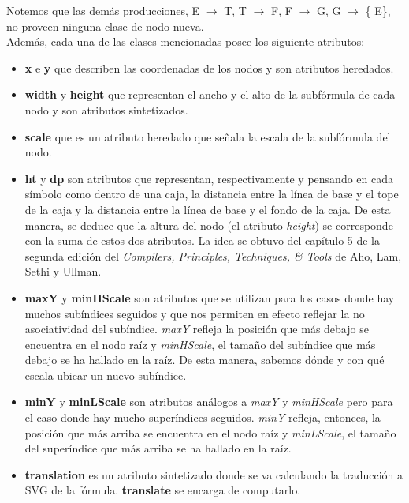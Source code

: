 \indent \indent Notemos que las demás producciones, E $\rightarrow$ T, T $\rightarrow$ F, F $\rightarrow$ G, G $\rightarrow$ \{ E\}, no proveen ninguna clase de nodo nueva.\\


\indent Además, cada una de las clases mencionadas posee los siguiente atributos:

\begin{itemize}
\item  \textbf{x} e \textbf{y} que describen las coordenadas de los nodos y son atributos heredados.
\item \textbf{width} y \textbf{height} que representan el ancho y el alto de la subfórmula de cada nodo y son atributos sintetizados.
\item \textbf{scale} que es un atributo heredado que señala la escala de la subfórmula del nodo.
\item \textbf{ht} y \textbf{dp} son atributos que representan, respectivamente y pensando en cada símbolo como dentro de una caja, la distancia entre la línea de base y el tope de la caja y la distancia entre la línea de base y el fondo de la caja. De esta manera, se deduce que la altura del nodo (el atributo \textit{height}) se corresponde con la suma de estos dos atributos. La idea se obtuvo del capítulo 5 de la segunda edición del \textit{Compilers, Principles, Techniques, \& Tools} de Aho, Lam, Sethi y Ullman.
\item \textbf{maxY} y \textbf{minHScale} son atributos que se utilizan para los casos donde hay muchos subíndices seguidos y que nos permiten en efecto reflejar la no asociatividad del subíndice. \textit{maxY} refleja la posición que más debajo se encuentra en el nodo raíz y \textit{minHScale}, el tamaño del subíndice que más debajo se ha hallado en la raíz. De esta manera, sabemos dónde y con qué escala ubicar un nuevo subíndice.
\item \textbf{minY} y \textbf{minLScale} son atributos análogos a \textit{maxY} y \textit{minHScale} pero para el caso donde hay mucho superíndices seguidos. \textit{minY} refleja, entonces, la posición que más arriba se encuentra en el nodo raíz y \textit{minLScale}, el tamaño del superíndice que más arriba se ha hallado en la raíz.
\item \textbf{translation} es un atributo sintetizado donde se va calculando la traducción a SVG de la fórmula. \textbf{translate} se encarga de computarlo.
\end{itemize}

